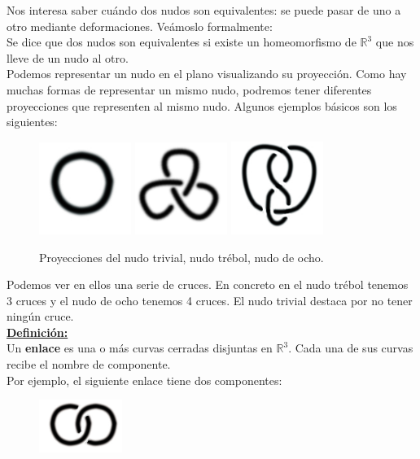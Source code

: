 \documentclass[14pt]{extarticle}
\begin{document}
Nos interesa saber cuándo dos nudos son equivalentes: se puede pasar de uno a otro mediante deformaciones. Veámoslo formalmente:\\

Se dice que dos nudos son equivalentes si existe un homeomorfismo de  $\mathds{R}^{3}$ que nos lleve de un nudo al otro. \\


Podemos representar un nudo en el plano visualizando su proyección. Como hay muchas formas de representar un mismo nudo, podremos tener diferentes proyecciones que representen al mismo nudo. 
 Algunos ejemplos básicos son los siguientes:\\
  \begin{figure}[h!]
  	\includegraphics[width=3cm]{inudos/1.jpg}
  	\includegraphics[width=3cm]{inudos/3f.png} 
  	\includegraphics[width=3cm]{inudos/fig8.jpg}
  	\centering
  	\caption{Proyecciones del nudo trivial, nudo trébol, nudo de ocho.}
  	\label{uno} 
  \end{figure}
  
  Podemos ver en ellos una serie de cruces. En concreto en el nudo trébol tenemos 3 cruces y el nudo de ocho tenemos 4 cruces. El nudo trivial destaca por no tener ningún cruce. \\
  
    \underline{\textbf{Definición:}}\\
     Un \textbf{enlace} es una o más curvas cerradas disjuntas en $\mathds{R}^{3}$. Cada una de sus curvas recibe el nombre de componente.\\
     Por ejemplo, el siguiente enlace tiene dos componentes:
  \begin{figure}[h!]
  	\includegraphics[width=2.7cm]{inudos/enlace.png}
  	\centering
  	\label{dos} 
  \end{figure}
\end{document}
